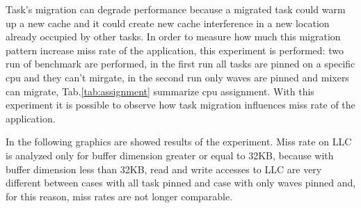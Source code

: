 Task's migration can degrade performance because a migrated task could warm up a new cache and it could create new cache interference in a new location 
already occupied by other tasks. In order to measure how much this migration pattern increase miss rate of the application, this experiment is performed: 
two run of benchmark are performed, in the first run all tasks are pinned on a specific cpu and they can't mirgate, in the second run only waves are pinned
and mixers can migrate, Tab.\ref{tab:assignment} summarize cpu assignment. With this experiment it is possible to observe how task migration influences 
miss rate of the application.
\newpage

\begin{table}[htbp]
\centering%
\hspace{4em}
\label{tab:assignment}
\caption{cpu assignment performed}
\end{table}

In the following graphics are showed results of the experiment. Miss rate on LLC is analyzed only for buffer dimension greater or equal to 32KB, because 
with buffer dimension less than 32KB, read and write accesses to LLC are very different between cases with all task pinned and case with only waves pinned 
and, for this reason, miss rates are not longer comparable.

